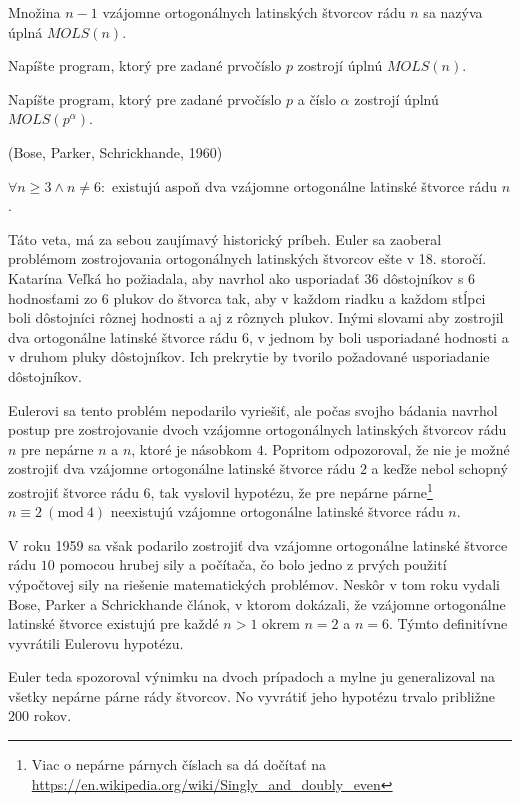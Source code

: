 \begin{definition}
Množina $n - 1$ vzájomne ortogonálnych latinských štvorcov rádu $n$ sa nazýva úplná $MOLS(n)$.
\end{definition}

\begin{exercise}
Napíšte program, ktorý pre zadané prvočíslo $p$ zostrojí úplnú $MOLS(n)$.
\end{exercise}

\begin{exercise}
Napíšte program, ktorý pre zadané prvočíslo $p$ a číslo $\alpha$ zostrojí úplnú $MOLS(p^\alpha)$.
\end{exercise}

\begin{theorem_hard}{(Bose, Parker, Schrickhande, 1960)}

$\forall n \geq 3 \wedge n \neq 6:$ existujú aspoň dva vzájomne ortogonálne latinské štvorce rádu $n$.

\end{theorem_hard}

\begin{remark}
Táto veta, má za sebou zaujímavý historický príbeh. Euler sa zaoberal problémom zostrojovania ortogonálnych latinských štvorcov ešte v 18. storočí. Katarína Veľká ho požiadala, aby navrhol ako usporiadať $36$ dôstojníkov s $6$ hodnosťami zo $6$ plukov do štvorca tak, aby v každom riadku a každom stĺpci boli dôstojníci rôznej hodnosti a aj z rôznych plukov. Inými slovami aby zostrojil dva ortogonálne latinské štvorce rádu $6$, v jednom by boli usporiadané hodnosti a v druhom pluky dôstojníkov. Ich prekrytie by tvorilo požadované usporiadanie dôstojníkov.

Eulerovi sa tento problém nepodarilo vyriešiť, ale počas svojho bádania navrhol postup pre zostrojovanie dvoch vzájomne ortogonálnych latinských štvorcov rádu $n$ pre nepárne $n$ a $n$, ktoré je násobkom $4$. Popritom odpozoroval, že nie je možné zostrojiť dva vzájomne ortogonálne latinské štvorce rádu $2$ a keďže nebol schopný zostrojiť štvorce rádu $6$, tak vyslovil hypotézu, že pre nepárne párne\footnote{Viac o nepárne párnych číslach sa dá dočítať na \url{ https://en.wikipedia.org/wiki/Singly_and_doubly_even}} $n \equiv 2\ (\textrm{mod}\ 4)$ neexistujú vzájomne ortogonálne latinské štvorce rádu $n$.

V roku 1959 sa však podarilo zostrojiť dva vzájomne ortogonálne latinské štvorce rádu $10$ pomocou hrubej sily a počítača, čo bolo jedno z prvých použití výpočtovej sily na riešenie matematických problémov. Neskôr v tom roku vydali Bose, Parker a Schrickhande článok, v ktorom dokázali, že vzájomne ortogonálne latinské štvorce existujú pre každé $n > 1$ okrem $n = 2$ a $n = 6$. Týmto definitívne vyvrátili Eulerovu hypotézu.

Euler teda spozoroval výnimku na dvoch prípadoch a mylne ju generalizoval na všetky nepárne párne rády štvorcov. No vyvrátiť jeho hypotézu trvalo približne $200$ rokov.    
\end{remark}


